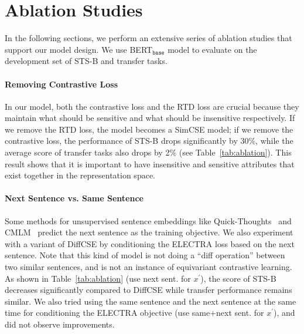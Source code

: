 \documentclass[11pt]{article}
\newcommand{\ba}{$_\texttt{base}$\xspace}
\begin{document}
\section{Ablation Studies}
\vspace{-2mm}
\label{sec:ablation}
In the following sections, we perform an extensive series of ablation studies that support our model design. We use BERT\ba model to evaluate on the development set of STS-B and transfer tasks.
\vspace{-2mm}
\paragraph{Removing Contrastive Loss}
In our model, both the contrastive loss and the RTD loss are crucial because they maintain what should be sensitive and what should be insensitive respectively. If we remove the RTD loss, the model becomes a SimCSE model; if we remove the contrastive loss, the performance of STS-B drops significantly by 30\%, while the average score of transfer tasks also drops by 2\% (see Table~\ref{tab:ablation}). This result shows that it is important to have insensitive and sensitive attributes that exist together in the representation space.


\paragraph{Next Sentence vs. Same Sentence}
Some methods for unsupervised sentence embeddings like Quick-Thoughts~\cite{logeswaran2018an-quick-thought} and CMLM~\cite{yang2020universal} predict the next sentence as the training objective. We also experiment with a variant of DiffCSE by conditioning the ELECTRA loss based on the next sentence. Note that this kind of model is not doing a ``diff operation'' between two similar sentences, and is not an instance of equivariant contrastive learning.
As shown in Table~\ref{tab:ablation} (use next sent. for $x^\prime$), the score of STS-B decreases significantly compared to DiffCSE while transfer performance remains similar. We also tried using the same sentence and the next sentence at the same time for conditioning the ELECTRA objective (use same+next sent. for $x^\prime$), and did not observe improvements.
\end{document}
